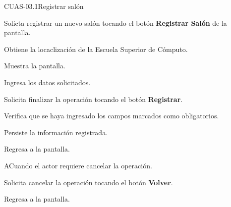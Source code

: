 \begin{UseCase}{CUAS-03.1}{Registrar salón}
 \end{UseCase}

 \begin{UCtrayectoria}
    
    \UCpaso [\UCactor] Solicta registrar un nuevo salón tocando el botón \textbf{Registrar Salón} de la pantalla.
    
    \UCpaso Obtiene la locaclización de la Escuela Superior de Cómputo.
    
    \UCpaso Muestra la pantalla.
    
    \UCpaso [\UCactor] Ingresa los datos solicitados.
    
    \UCpaso [\UCactor] Solicita finalizar la operación tocando el botón \textbf{Registrar}. 
    
    \UCpaso Verifica que se haya ingresado los campos marcados como obligatorios.
    
    \UCpaso Persiste la información registrada.
    
    \UCpaso Regresa a la pantalla.
    
\end{UCtrayectoria}

\begin{UCtrayectoriaA}{A}{Cuando el actor requiere cancelar la operación.}
	
	\UCpaso [\UCactor] Solicita cancelar la operación tocando el botón \textbf{Volver}.
	
	\UCpaso Regresa a la pantalla.
	
\end{UCtrayectoriaA}


